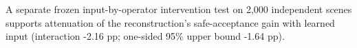 A separate frozen input-by-operator intervention test on 2,000 independent scenes supports attenuation of the reconstruction's safe-acceptance gain with learned input (interaction -2.16 pp; one-sided 95\% upper bound -1.64 pp).
